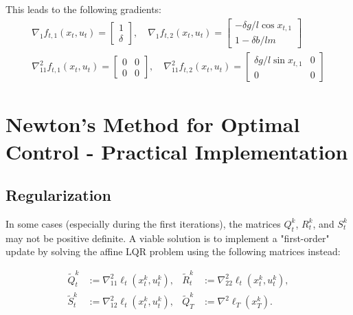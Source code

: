 \documentclass[openany]{book}
\theoremstyle{definition}
\theoremstyle{remark}
\begin{document}
This leads to the following gradients:
\begin{gather*}
    \nabla_1f_{t,1}(x_t,u_t) = \begin{bmatrix}
        1 \\ \delta
    \end{bmatrix}, \quad
    \nabla_1f_{t,2}(x_t,u_t) = \begin{bmatrix}
        -\delta g/l\cos x_{t,1} \\ 1-\delta b/lm
    \end{bmatrix}\\
    \nabla_{11}^2f_{t,1}(x_t,u_t) = \begin{bmatrix}
        0 & 0 \\ 0 & 0
    \end{bmatrix}, \quad
    \nabla_{11}^2f_{t,2}(x_t,u_t) = \begin{bmatrix}
        \delta g/l\sin x_{t,1} & 0 \\ 0 & 0
    \end{bmatrix}
\end{gather*}

\section{Newton's Method for Optimal Control - Practical Implementation}

\subsection{Regularization}
In some cases (especially during the first iterations), the matrices $Q_t^k$, $R_t^k$, and $S_t^k$ may not be positive definite. A viable solution is to implement a "first-order" update by solving the affine LQR problem using the following matrices instead:

\begin{align*}
    \tilde{Q}_t^k &:= \nabla_{11}^2\ell_t(x_t^k, u_t^k), & \tilde{R}_t^k &:= \nabla_{22}^2\ell_t(x_t^k, u_t^k),\\
    \tilde{S}_t^k &:= \nabla_{12}^2\ell_t(x_t^k, u_t^k), & \tilde{Q}_T^k &:= \nabla^2\ell_T(x_T^k).
\end{align*}
\end{document}
